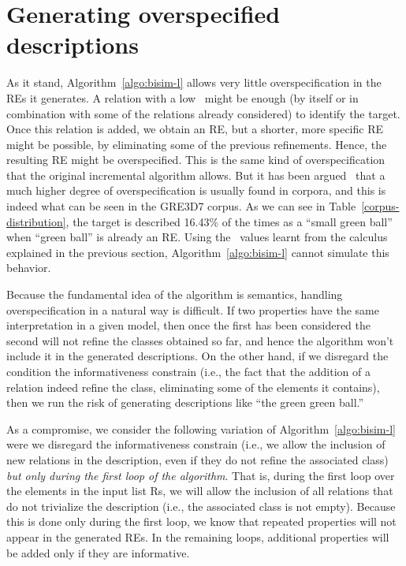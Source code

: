 \section{Generating overspecified descriptions} 
\label{sec:overspecification}

As it stand, Algorithm~\ref{algo:bisim-l} allows very little overspecification in the REs it
generates.  A relation with a low \puse\ might be enough 
(by itself or in combination with some of the relations already considered) to 
identify the target. Once this relation is added, we obtain an RE, but a shorter, 
more specific RE might be possible, by eliminating some of the previous refinements. 
Hence, the resulting RE might be overspecified. This is the same kind of overspecification 
that the original incremental algorithm allows.  But it has been argued~\cite{Engelhardt_Bailey_Ferreira_2006,Arts_Maes_Noordman_Jansen_2011} that 
a much higher degree of overspecification is usually found in corpora, and this 
is indeed what can be seen in the GRE3D7 corpus.  As we can see in Table~\ref{corpus-distribution}, 
the target is described 16.43\% of the times as a ``small green ball'' when ``green 
ball'' is already an RE.  Using the \puse\ values learnt from the calculus explained
in the previous section, Algorithm~\ref{algo:bisim-l} cannot simulate this behavior. 

Because the fundamental idea of the algorithm is semantics, handling overspecification in 
a natural way is difficult. If two properties have the same interpretation in a given 
model, then once the first has been considered the second will not refine the classes 
obtained so far, and hence the algorithm won't include it in the generated descriptions. 
On the other hand, if we disregard the condition the informativeness constrain (i.e., 
the fact that the addition of a relation indeed refine the class, eliminating some of 
the elements it contains), then we run the risk of generating descriptions like ``the green 
green ball.''

As a compromise, we consider the following variation of Algorithm~\ref{algo:bisim-l} were 
we disregard the informativeness constrain (i.e., we allow the inclusion of new relations 
in the description, even if they do not refine the associated class) \emph{but only during the 
first loop of the algorithm}.  That is, during the first loop over the elements in the 
input list Rs, we will allow the inclusion of all relations that do not trivialize the 
description (i.e., the associated class is not empty).  Because this is done only during 
the first loop, we know that repeated properties will not appear in the generated REs.  
In the remaining loops, additional properties will be added only if they are informative. 

